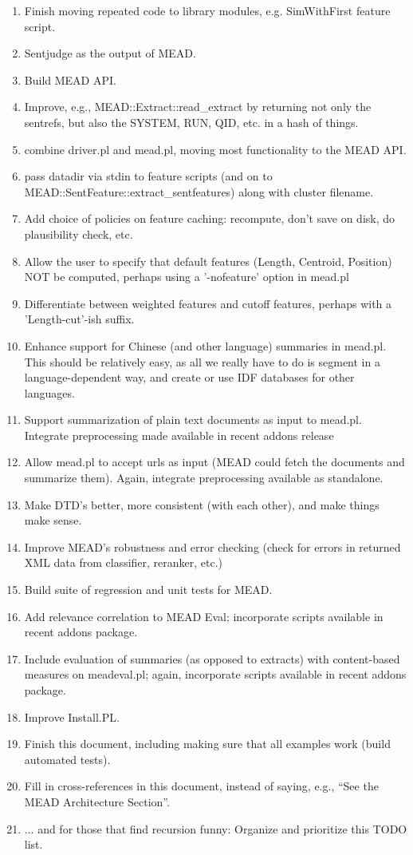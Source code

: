 \documentclass[10pt]{article}
\begin{document}
\begin{enumerate}
\item Finish moving repeated code to library modules,
  e.g. SimWithFirst feature script.
\item Sentjudge as the output of MEAD.
\item Build MEAD API.
\item Improve, e.g., MEAD::Extract::read\_extract by returning
  not only the sentrefs, but also the SYSTEM, RUN, QID, etc. in 
  a hash of things.
\item combine driver.pl and mead.pl, moving most functionality to 
  the MEAD API.
\item pass datadir via stdin to feature scripts (and on to 
  MEAD::SentFeature::extract\_sentfeatures) along with cluster
  filename.
\item Add choice of policies on feature caching: recompute,
  don't save on disk, do plausibility check, etc.
\item Allow the user to specify that default features (Length,
  Centroid, Position) NOT be computed, perhaps using a
  '-nofeature' option in mead.pl
\item Differentiate between weighted features and cutoff
  features, perhaps with a 'Length-cut'-ish suffix.
\item Enhance support for Chinese (and other language) summaries in mead.pl.
  This should be relatively easy, as all we really have to do 
  is segment in a language-dependent way, and create or use IDF
  databases for other languages.
\item Support summarization of plain text documents as input
  to mead.pl.  Integrate preprocessing made available in recent 
  addons release
\item Allow mead.pl to accept urls as input (MEAD could fetch the
  documents and summarize them).  Again, integrate preprocessing
  available as standalone.
\item Make DTD's better, more consistent (with each other), and 
  make things make sense.
\item Improve MEAD's robustness and error checking (check for errors in
  returned XML data from classifier, reranker, etc.)
\item Build suite of regression and unit tests for MEAD.
\item Add relevance correlation to MEAD Eval; incorporate 
   scripts available in recent addons package.
\item Include evaluation of summaries (as opposed to extracts) 
  with content-based measures on meadeval.pl; again, incorporate
  scripts available in recent addons package.
\item Improve Install.PL.
\item Finish this document, including making sure that all
  examples work (build automated tests).
\item Fill in cross-references in this document, instead of
  saying, e.g., ``See the MEAD Architecture Section''.
\item ... and for those that find recursion funny: 
  Organize and prioritize this TODO list.
\end{enumerate}
\end{document}
